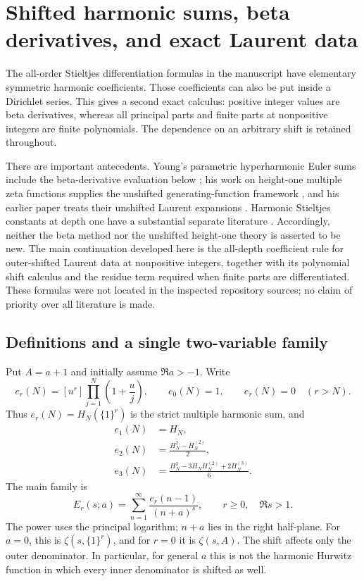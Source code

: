 \section{Shifted harmonic sums, beta derivatives, and exact Laurent data}
\label{harm:sec:main}

The all-order Stieltjes differentiation formulas in the manuscript have
elementary symmetric harmonic coefficients.  Those coefficients can also
be put inside a Dirichlet series.  This gives a second exact calculus:
positive integer values are beta derivatives, whereas all principal parts
and finite parts at nonpositive integers are finite polynomials.  The
dependence on an arbitrary shift is retained throughout.

There are important antecedents.  Young's parametric hyperharmonic Euler
sums include the beta-derivative evaluation below
\cite{Young2026}; his work on height-one multiple zeta functions supplies
the unshifted generating-function framework \cite{Young2024}, and his
earlier paper treats their unshifted Laurent expansions \cite{Young2023}.  Harmonic
Stieltjes constants at depth one have a substantial separate literature
\cite{HarmonicStieltjes2023}.  Accordingly, neither the beta method nor the
unshifted height-one theory is asserted to be new.  The main continuation
developed here is the all-depth coefficient rule for outer-shifted
Laurent data at nonpositive integers, together with its polynomial shift
calculus and the residue term required when finite parts are
differentiated.  These formulas were not located in the inspected
repository sources; no claim of priority over all literature is made.

\subsection{Definitions and a single two-variable family}

Put $A=a+1$ and initially assume $\Re a>-1$.  Write
\begin{equation}\label{harm:eq:elementary}
 e_r(N)=[u^r]\prod_{j=1}^{N}\left(1+\frac uj\right),
 \qquad e_0(N)=1,
 \qquad e_r(N)=0\quad(r>N).
\end{equation}
Thus $e_r(N)=H_N(\{1\}^r)$ is the strict multiple harmonic sum, and
\begin{align*}
 e_1(N)&=H_N,\\
 e_2(N)&=\frac{H_N^2-H_N^{(2)}}2,\\
 e_3(N)&=\frac{H_N^3-3H_NH_N^{(2)}+2H_N^{(3)}}6.
\end{align*}
The main family is
\begin{equation}\label{harm:eq:E}
 E_r(s;a)=\sum_{n=1}^{\infty}\frac{e_r(n-1)}{(n+a)^s},
 \qquad r\geq0,\quad \Re s>1.
\end{equation}
The power uses the principal logarithm; $n+a$ lies in the right half-plane.
For $a=0$, this is $\zeta(s,\{1\}^r)$, and for $r=0$ it is
$\zeta(s,A)$.  The shift affects only the outer denominator.  In
particular, for general $a$ this is not the harmonic Hurwitz function
in which every inner denominator is shifted as well.

